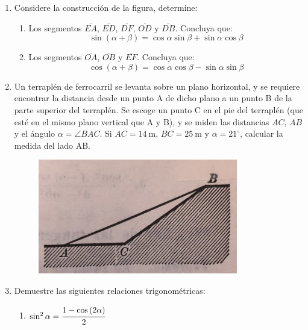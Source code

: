 \documentclass[letterpaper,11pt]{article}
\begin{document}
\begin{enumerate}
\item Considere la construcción de la figura, determine:

\begin{multicols}{2}
    \begin{figure}[H]
        \centering
        
    \end{figure}
    \columnbreak
    \begin{enumerate}
        \item Los segmentos $\overline{EA}$, $\overline{ED}$, $\overline{DF}$, $\overline{OD}$ y $\overline{DB}$.
        Concluya que: $$\sin\left(\alpha+\beta\right)=\cos\alpha\sin\beta+\sin\alpha\cos\beta$$
        \item Los segmentos $\overline{OA}$, $\overline{OB}$ y $\overline{EF}$.
        Concluya que: $$\cos\left(\alpha+\beta\right)=\cos\alpha\cos\beta-\sin\alpha\sin\beta$$
    \end{enumerate}
\end{multicols}

\item Un terraplén de ferrocarril se levanta sobre un plano horizontal, y se requiere encontrar la distancia desde un punto A de dicho plano a un punto B de la parte superior del terraplén. Se escoge un punto C en el pie del terraplén (que esté en el mismo plano vertical que A y B), y se miden las distancias $AC$, $AB$ y el ángulo $\alpha = \angle BAC$. Si $AC = \SI{14}{\m}$, $BC = \SI{25}{\m}$ y $\alpha = 21^{\circ}$, calcular la medida del lado AB.


 \begin{figure}[H]
    \centering
     \includegraphics[height=5cm]{2022-2/Imagenes/t1p2.jpg}
 \end{figure}

 \item Demuestre las siguientes relaciones trigonométricas:
    {
    \begin{multicols}{2}
        \begin{enumerate}
        \item $\sin^2\alpha = \cfrac{1 - \cos{(2\alpha)}}{2}$
        

\end{enumerate}
\end{multicols}}
\end{enumerate}
\end{document}
